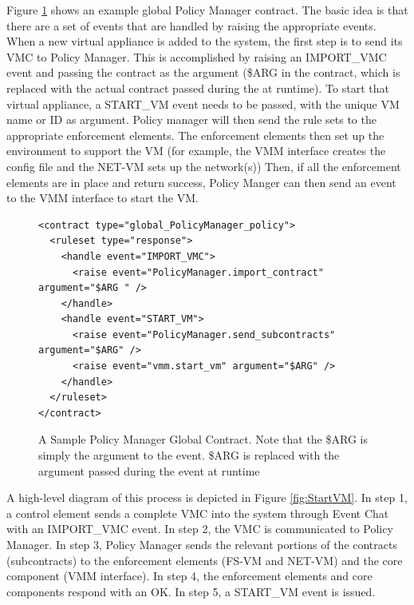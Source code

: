 Figure \ref{lst:PolicyManager_global} shows an example global Policy Manager contract. The basic idea is that there are a set of events that are handled by raising the appropriate events. When a new virtual appliance is added to the system, the first step is to send its VMC to Policy Manager. This is accomplished by raising an IMPORT\_VMC event and passing the contract as the argument (\$ARG in the contract, which is replaced with the actual contract passed during the at runtime). To start that virtual appliance, a START\_VM event needs to be passed, with the unique VM name or ID as argument. Policy manager will then send the rule sets to the appropriate enforcement elements. The enforcement elements then set up the environment to support the VM (for example, the VMM interface creates the config file and the NET-VM sets up the network(s)) Then, if all the enforcement elements are in place and return success, Policy Manger can then send an event to the VMM interface to start the VM. 

\begin{figure}[tbp]
\caption{A Sample Policy Manager Global Contract. Note that the \$ARG is simply the argument to the event. \$ARG is replaced with the argument passed during the event at runtime}
\label{lst:PolicyManager_global}

\begin{lstlisting}
<contract type="global_PolicyManager_policy">
  <ruleset type="response">
    <handle event="IMPORT_VMC">
      <raise event="PolicyManager.import_contract" argument="$ARG " />
    </handle>
    <handle event="START_VM">
      <raise event="PolicyManager.send_subcontracts" argument="$ARG" />
      <raise event="vmm.start_vm" argument="$ARG" />
    </handle>
  </ruleset>
</contract>
\end{lstlisting}
\end{figure}


A high-level diagram of this process is depicted in Figure \ref{fig:StartVM}. In step 1, a control element sends a complete VMC into the system through Event Chat with an IMPORT\_VMC event. In step 2, the VMC is communicated to Policy Manager. In step 3, Policy Manager sends the relevant portions of the contracts (subcontracts) to the enforcement elements (FS-VM and NET-VM) and the core component (VMM interface). In step 4, the enforcement elements and core components respond with an OK. In step 5, a START\_VM event is issued.

